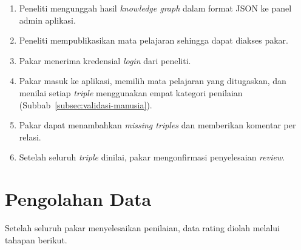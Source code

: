 \documentclass[../../thesis]{subfiles}
\begin{document}
\begin{enumerate}
  \item Peneliti mengunggah hasil \textit{knowledge graph} dalam format
        JSON ke panel admin aplikasi.
  \item Peneliti mempublikasikan mata pelajaran sehingga dapat diakses
        pakar.
  \item Pakar menerima kredensial \textit{login} dari
        peneliti.
  \item Pakar masuk ke aplikasi, memilih mata pelajaran yang
        ditugaskan, dan menilai setiap \textit{triple} menggunakan empat
        kategori penilaian (Subbab~\ref{subsec:validasi-manusia}).
  \item Pakar dapat menambahkan \textit{missing triples} dan
        memberikan komentar per relasi.
  \item Setelah seluruh \textit{triple} dinilai, pakar
        mengonfirmasi penyelesaian \textit{review}.
\end{enumerate}

\section{Pengolahan Data}\label{sec:pengolahan-data}

Setelah seluruh pakar menyelesaikan penilaian, data rating
diolah melalui tahapan berikut.
\end{document}
